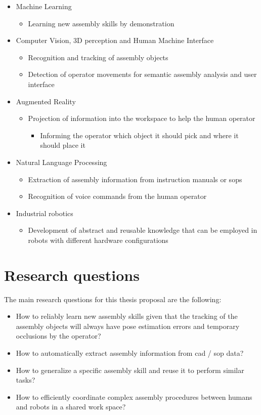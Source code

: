 \begin{itemize}
	\item Machine Learning
	\begin{itemize}
		\item Learning new assembly skills by demonstration
	\end{itemize}
	\item Computer Vision, 3D perception and Human Machine Interface
	\begin{itemize}
		\item Recognition and tracking of assembly objects
		\item Detection of operator movements for semantic assembly analysis and user interface
	\end{itemize}
	\item Augmented Reality
	\begin{itemize}
		\item Projection of information into the workspace to help the human operator
		\begin{itemize}
			\item Informing the operator which object it should pick and where it should place it
		\end{itemize}
	\end{itemize}
	\item Natural Language Processing
	\begin{itemize}
		\item Extraction of assembly information from instruction manuals or \glspl{sop}
		\item Recognition of voice commands from the human operator
	\end{itemize}
	\item Industrial robotics
	\begin{itemize}
		\item Development of abstract and reusable knowledge that can be employed in robots with different hardware configurations
	\end{itemize}
\end{itemize}



\section{Research questions}

The main research questions for this thesis proposal are the following:

\begin{itemize}
	\item How to reliably learn new assembly skills given that the tracking of the assembly objects will always have pose estimation errors and temporary occlusions by the operator?
	\item How to automatically extract assembly information from \gls{cad} / \gls{sop} data?
	\item How to generalize a specific assembly skill and reuse it to perform similar tasks?
	\item How to efficiently coordinate complex assembly procedures between humans and robots in a shared work space?
\end{itemize}



